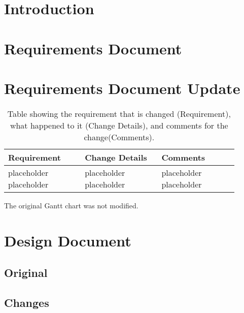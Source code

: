 \documentclass[10pt,journal,compsoc,draftclsnofoot]{IEEEtran}
\begin{document}
\begin{flushleft}

\section{Introduction}


\section{Requirements Document}



\section{Requirements Document Update}

\begin{center}
\begin{table}[H]
\caption{Table showing the requirement that is changed (Requirement), what happened to it (Change Details), and comments for the change(Comments).}
\begin{tabular}{ | p{0.3\linewidth} | p{0.3\linewidth} | p{0.3\linewidth} | }
\hline
\textbf{Requirement}  & \textbf{Change Details}  & \textbf{Comments} \\ \hline

placeholder placeholder & 
placeholder placeholder & 
placeholder placeholder \\ \hline

\end{tabular}
\newline
\label{table:retro}
\end{table}
\end{center}

The original Gantt chart was not modified.

\section{Design Document}

\subsection{Original}


\subsection{Changes}





\end{flushleft}
\end{document}
